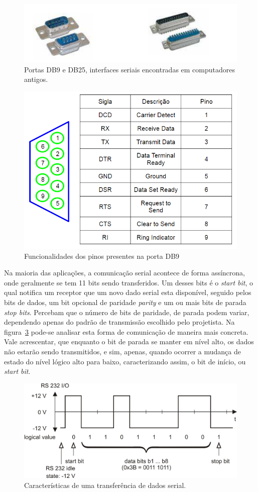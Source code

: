 \documentclass[12pt]{article}
\begin{document}
\begin{figure}[!htbp]
\centering
\includegraphics[width=.5\textwidth]{img/p4/fig8DB9DB25.png}
\caption{Portas DB9 e DB25, interfaces seriais encontradas em computadores antigos.}
\label{fig:db9db25}
\end{figure}

\begin{figure}[!htbp]
\centering
\includegraphics[width=.5\textwidth]{img/p4/Fig9serial_pinos.png}
\caption{Funcionalidades dos pinos presentes na porta DB9}
\label{fig:pinosdb9}
\end{figure}



Na maioria das aplicações, a comunicação serial acontece de forma assíncrona, onde geralmente se tem 11 bits sendo transferidos. Um desses bits é o \textit{start bit}, o qual notifica um receptor que um novo dado serial esta disponível, seguido pelos bits de dados, um bit opcional de paridade \textit{parity} e um ou mais bits de parada \textit{stop bits}\cite{porta-serial}. Percebam que o número de bits de paridade, de parada podem variar, dependendo apenas do padrão de transmissão escolhido pelo projetista. Na figura~\ref{fig:cserial} pode-se analisar esta forma de comunicação de maneira mais concreta. Vale acrescentar, que enquanto o bit de parada se manter em nível alto, os dados não estarão sendo transmitidos, e sim, apenas, quando ocorrer a mudança de estado do nível lógico alto para baixo, caracterizando assim, o bit de início, ou \textit{start bit}. 


\begin{figure}[!htbp]
\centering
\includegraphics[width=.5\textwidth]{img/p4/Fig10rs232.jpg}
\caption{Características de uma transferência de dados serial.}
\label{fig:cserial}
\end{figure}
\end{document}
